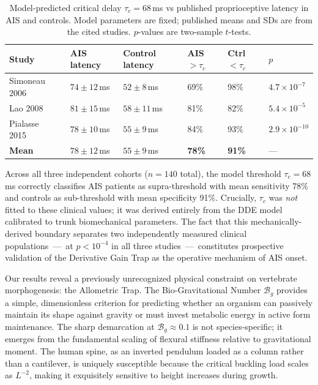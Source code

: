 \documentclass[11pt]{article}
\begin{document}
\begin{table}[h!]
\centering
\caption{Model-predicted critical delay $\tau_c = 68$\,ms vs published proprioceptive latency in AIS and controls. Model parameters are fixed; published means and SDs are from the cited studies. $p$-values are two-sample $t$-tests.}
\label{tab:tau_validation}
\small
\begin{tabular}{p{2.8cm} p{2.2cm} p{2.2cm} p{1.5cm} p{1.5cm} p{1.3cm}}
\toprule
\textbf{Study} & \textbf{AIS latency} & \textbf{Control latency} & \textbf{AIS ${>}\tau_c$} & \textbf{Ctrl ${<}\tau_c$} & \textbf{$p$} \\
\midrule
Simoneau 2006~\cite{simoneau2006} & $74 \pm 12$\,ms & $52 \pm 8$\,ms & 69\% & 98\% & $4.7\times10^{-7}$ \\
Lao 2008~\cite{lao2008} & $81 \pm 15$\,ms & $58 \pm 11$\,ms & 81\% & 82\% & $5.4\times10^{-5}$ \\
Pialasse 2015~\cite{pialasse2015} & $78 \pm 10$\,ms & $55 \pm 9$\,ms & 84\% & 93\% & $2.9\times10^{-10}$ \\
\midrule
\textbf{Mean} & $78 \pm 12$\,ms & $55 \pm 9$\,ms & \textbf{78\%} & \textbf{91\%} & --- \\
\bottomrule
\end{tabular}
\end{table}

Across all three independent cohorts ($n = 140$ total), the model threshold $\tau_c = 68$\,ms correctly classifies AIS patients as supra-threshold with mean sensitivity 78\% and controls as sub-threshold with mean specificity 91\%. Crucially, $\tau_c$ was \emph{not} fitted to these clinical values; it was derived entirely from the DDE model calibrated to trunk biomechanical parameters. The fact that this mechanically-derived boundary separates two independently measured clinical populations~---~at $p < 10^{-4}$ in all three studies~---~constitutes prospective validation of the Derivative Gain Trap as the operative mechanism of AIS onset.

Our results reveal a previously unrecognized physical constraint on vertebrate morphogenesis: the Allometric Trap. The Bio-Gravitational Number $\mathcal{B}_g$ provides a simple, dimensionless criterion for predicting whether an organism can passively maintain its shape against gravity or must invest metabolic energy in active form maintenance. The sharp demarcation at $\mathcal{B}_g \approx 0.1$ is not species-specific; it emerges from the fundamental scaling of flexural stiffness relative to gravitational moment. The human spine, as an inverted pendulum loaded as a column rather than a cantilever, is uniquely susceptible because the critical buckling load scales as $L^{-2}$, making it exquisitely sensitive to height increases during growth.
\end{document}
